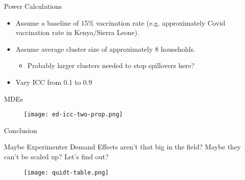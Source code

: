 \documentclass[aspectratio=169,xcolor=dvipsnames]{beamer}
\begin{document}
\begin{frame}{Power Calculations}

\begin{itemize}
    \item Assume a baseline of 15\% vaccination rate (e.g. approximately Covid vaccination 
    rate in Kenya/Sierra Leone).
    \item Assume average cluster size of approximately 8 households.
    \begin{itemize}
        \item Probably larger clusters needed to stop spillovers here?
    \end{itemize}     
    \item Vary ICC from 0.1 to 0.9
\end{itemize}
\end{frame}


\begin{frame}{MDEs}

    \begin{figure}[htbp]
        \centering
        \texttt{[image: ed-icc-two-prop.png]} 
    \end{figure}
    

\end{frame}

\begin{frame}{Conclusion}


    Maybe Experimenter Demand Effects aren't that big in the field?
    \vfill
    Maybe they can't be scaled up?
    \vfill
    Let's find out?

    

\end{frame}

\begin{frame}[label=res-table]

    \begin{figure}[htbp]
        \centering
        \texttt{[image: quidt-table.png]} 
    \end{figure}
    \hyperlink{magnitudes}{}

\end{frame}
\end{document}
